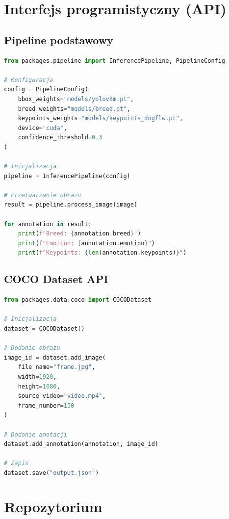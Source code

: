 \documentclass[12pt,a4paper]{article}
\begin{document}
\section{Interfejs programistyczny (API)}

\subsection{Pipeline podstawowy}

\begin{lstlisting}[language=Python, caption=Przykład użycia API]
from packages.pipeline import InferencePipeline, PipelineConfig

# Konfiguracja
config = PipelineConfig(
    bbox_weights="models/yolov8m.pt",
    breed_weights="models/breed.pt",
    keypoints_weights="models/keypoints_dogflw.pt",
    device="cuda",
    confidence_threshold=0.3
)

# Inicjalizacja
pipeline = InferencePipeline(config)

# Przetwarzanie obrazu
result = pipeline.process_image(image)

for annotation in result:
    print(f"Breed: {annotation.breed}")
    print(f"Emotion: {annotation.emotion}")
    print(f"Keypoints: {len(annotation.keypoints)}")
\end{lstlisting}

\subsection{COCO Dataset API}

\begin{lstlisting}[language=Python, caption=Tworzenie datasetu COCO]
from packages.data.coco import COCODataset

# Inicjalizacja
dataset = COCODataset()

# Dodanie obrazu
image_id = dataset.add_image(
    file_name="frame.jpg",
    width=1920,
    height=1080,
    source_video="video.mp4",
    frame_number=150
)

# Dodanie anotacji
dataset.add_annotation(annotation, image_id)

# Zapis
dataset.save("output.json")
\end{lstlisting}

\section{Repozytorium}
\end{document}
